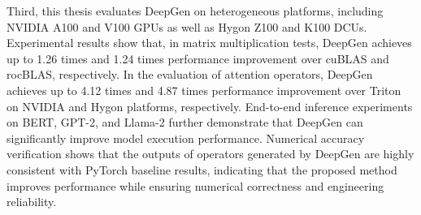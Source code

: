 {Third, this thesis evaluates DeepGen on heterogeneous platforms, including NVIDIA A100 and V100 GPUs as well as Hygon Z100 and K100 DCUs. Experimental results show that, in matrix multiplication tests, DeepGen achieves up to 1.26 times and 1.24 times performance improvement over cuBLAS and rocBLAS, respectively. In the evaluation of attention operators, DeepGen achieves up to 4.12 times and 4.87 times performance improvement over Triton on NVIDIA and Hygon platforms, respectively. End-to-end inference experiments on BERT, GPT-2, and Llama-2 further demonstrate that DeepGen can significantly improve model execution performance. Numerical accuracy verification shows that the outputs of operators generated by DeepGen are highly consistent with PyTorch baseline results, indicating that the proposed method improves performance while ensuring numerical correctness and engineering reliability.
}

\makecover

\clearpage
